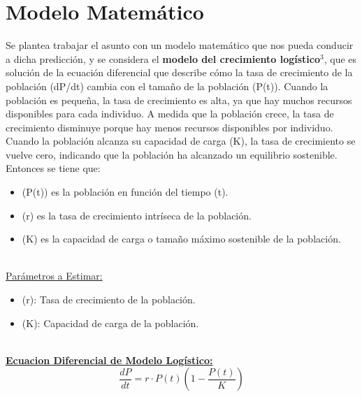 \documentclass[a4paper,10pt,twocolumn]{article}
\begin{document}
\section{Modelo Matemático}\label{sec:dev}
 Se plantea trabajar el asunto con un modelo matemático que nos pueda conducir a dicha predicción, y se considera 
 el \textbf{modelo del crecimiento logístico}$^{3}$, que es solución de la ecuación diferencial que describe cómo la tasa de crecimiento de la población (dP/dt) 
 cambia con el tamaño de la población (P(t)). Cuando la población es pequeña, la tasa de crecimiento es alta, ya que 
 hay muchos recursos disponibles para cada individuo. A medida que la población crece, la tasa de crecimiento disminuye 
 porque hay menos recursos disponibles por individuo. Cuando la población alcanza su capacidad de carga (K), la tasa 
 de crecimiento se vuelve cero, indicando que la población ha alcanzado un equilibrio sostenible.\\
 Entonces se tiene que:
\begin{itemize}
    \item (P(t)) es la población en función del tiempo (t).
    \item (r) es la tasa de crecimiento intríseca de la población.
    \item (K) es la capacidad de carga o tamaño máximo sostenible de la población.
\end{itemize}\\
\underline{Parámetros a Estimar:}
\begin{itemize}
    \item (r): Tasa de crecimiento  de la población. 
    \item (K): Capacidad de carga de la población.
\end{itemize}\\
\textbf{\underline{Ecuacion Diferencial de Modelo Logístico:}} $$\frac{dP}{dt} = r \cdot P(t)(1 - \frac{P(t)}{K})$$\\\\
\end{document}

